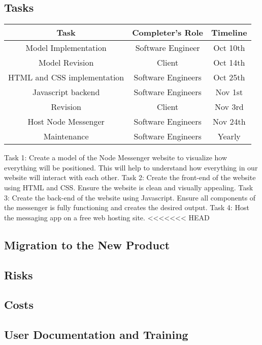\documentclass[12pt, titlepage]{article}
\begin{document}
    	\subsection{Tasks}
    	\begin{center}
    		\begin{tabular}{|c|c|c|}
    		\hline 
    		Task & Completer's Role & Timeline \\ 
    		\hline 
    		Model Implementation & Software Engineer & Oct 10th \\ 
    		\hline 
    		Model Revision & Client & Oct 14th \\ 
    		\hline 
    		HTML and CSS implementation & Software Engineers & Oct 25th \\ 
    		\hline 
    		Javascript backend & Software Engineers &  Nov 1st\\ 
    		\hline 
    		Revision & Client & Nov 3rd \\ 
    		\hline 
    		Host Node Messenger& Software Engineers & Nov 24th \\ 
    		\hline 
    		Maintenance & Software Engineers & Yearly \\ 
    		\hline 
    	\end{tabular} 
    	\end{center}
		Task 1: Create a model of the Node Messenger website to visualize how everything will be positioned. This will help to understand how everything in our website will interact with each other. Task 2: Create the front-end of the website using HTML and CSS. Ensure the website is clean and visually appealing. Task 3: Create the back-end of the website using Javascript. Ensure all components of the messenger is fully functioning and creates the desired output. Task 4: Host the messaging app on a free web hosting site.
<<<<<<< HEAD
		
    	\subsection{Migration to the New Product}

    	\subsection{Risks}

    	\subsection{Costs}

    	\subsection{User Documentation and Training}
\end{document}
